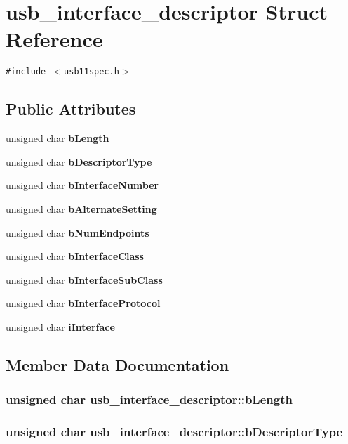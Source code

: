 \section{usb\_\-interface\_\-descriptor Struct Reference}
\label{structusb__interface__descriptor}
{\tt \#include $<$usb11spec.h$>$}

\subsection*{Public Attributes}
\begin{CompactItemize}
\item 
unsigned char {\bf b\-Length}
\item 
unsigned char {\bf b\-Descriptor\-Type}
\item 
unsigned char {\bf b\-Interface\-Number}
\item 
unsigned char {\bf b\-Alternate\-Setting}
\item 
unsigned char {\bf b\-Num\-Endpoints}
\item 
unsigned char {\bf b\-Interface\-Class}
\item 
unsigned char {\bf b\-Interface\-Sub\-Class}
\item 
unsigned char {\bf b\-Interface\-Protocol}
\item 
unsigned char {\bf i\-Interface}
\end{CompactItemize}


\subsection{Member Data Documentation}
\subsubsection{\setlength{\rightskip}{0pt plus 5cm}unsigned char {\bf usb\_\-interface\_\-descriptor::b\-Length}}\label{structusb__interface__descriptor_b9215c92cfcaa3148327be0ef0e093d6}


\subsubsection{\setlength{\rightskip}{0pt plus 5cm}unsigned char {\bf usb\_\-interface\_\-descriptor::b\-Descriptor\-Type}}\label{structusb__interface__descriptor_36102cd4eda6f5588c90dca01a989476}


